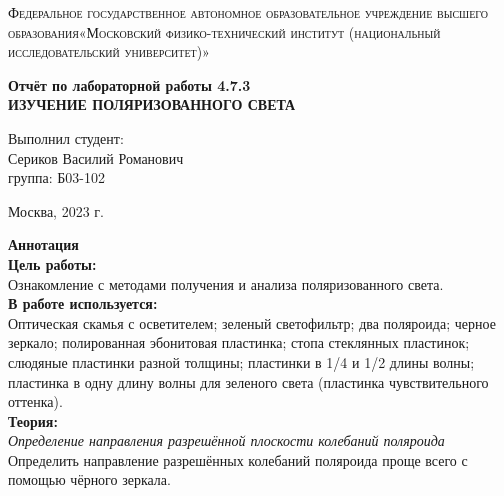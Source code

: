 \documentclass[a4paper, 12pt]{article}%
\begin{document}
	\begin{titlepage}
		\begin{center}
			\textsc{Федеральное государственное автономное образовательное учреждение высшего образования«Московский физико-технический институт (национальный исследовательский университет)»\\[5mm]
			}
			
			\vfill
			
			\textbf{Отчёт по лабораторной работы 4.7.3\\[3mm]
				ИЗУЧЕНИЕ
				ПОЛЯРИЗОВАННОГО СВЕТА 
				\\[50mm]
			}
			
		\end{center}
		
		\hfill
		\begin{minipage}{.5\textwidth}
			Выполнил студент:\\[2mm]
			Сериков Василий Романович\\[2mm]
			группа: Б03-102\\[5mm]
			
		\end{minipage}
		\vfill
		\begin{center}
			Москва, 2023 г.
		\end{center}
		
	\end{titlepage}
	
	\newpage
	\textbf{Аннотация}\\
	
	
	\textbf{Цель работы: }\\
	Ознакомление с методами получения и анализа поляризованного света.\\
	
	\textbf{В работе используется: }\\
	Оптическая скамья с осветителем; зеленый светофильтр; два поляроида; черное зеркало; полированная эбонитовая пластинка; стопа стеклянных пластинок; слюдяные пластинки разной толщины; пластинки в 1/4 и 1/2 длины волны; пластинка
	в одну длину волны для зеленого света (пластинка чувствительного
	оттенка).\\
	
	\textbf{Теория: }\\
	
	\textit{Определение направления разрешённой плоскости колебаний поляроида}\\
	
	Определить направление разрешённых колебаний поляроида проще всего с помощью чёрного зеркала.
	
\end{document}
